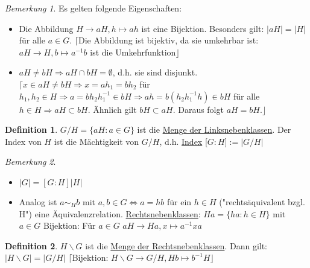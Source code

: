 \documentclass[12pt]{scrartcl}%
\theoremstyle{definition}
\newtheorem*{defn}{Definition}
\theoremstyle{remark}
\newtheorem*{nb}{Bemerkung}
\begin{document}
\begin{nb}
	Es gelten folgende Eigenschaften: 
	\begin{itemize}
		\item Die Abbildung $H \rightarrow aH, h \mapsto ah$ ist eine Bijektion. Besonders gilt: $\vert aH \vert = \vert H \vert$ für alle $a \in G$. \newline $\lceil$Die Abbildung ist bijektiv, da sie umkehrbar ist: $aH \rightarrow H, b \mapsto a^{-1}b$ ist die Umkehrfunktion$\rfloor$
		\item $aH \neq bH \Rightarrow aH \cap bH = \emptyset$, d.h. sie sind disjunkt. \newline $\lceil x \in aH \neq bH \Rightarrow x = ah_{1} = bh_{2}$ für $h_{1},h_{2} \in H \Rightarrow a=bh_{2}h_{1}^{-1} \in bH \Rightarrow ah= b(h_{2}h_{1}^{-1}h) \in bH$ für alle $h \in H \Rightarrow aH \subset bH$. Ähnlich gilt $bH \subset aH$. Daraus folgt $aH=bH.\rfloor$ %
	\end{itemize}
\end{nb}

\begin{defn}
	$G/H = \lbrace aH : a \in G \rbrace$ ist die \underline{Menge der Linksnebenklassen}. \newline Der Index von $H$ ist die Mächtigkeit von $G/H$, d.h. \underline{Index} [$G:H$]$:=\vert G/H \vert$
\end{defn}

\begin{nb}
	\begin{itemize}
	 	\item $\vert G \vert = [G:H]\vert H\vert$
	 	\item Analog ist $a \sim_{H} b$ mit $a,b \in G \Leftrightarrow a=hb$ für ein $h \in H$ ("rechtsäquivalent bzgl. H") eine Äquivalenzrelation.
		\underline{Rechtsnebenklassen}: $Ha=\lbrace ha : h \in H\rbrace$ mit $a \in G$ \newline Bijektion: Für $a \in G$ $aH \rightarrow Ha, x \mapsto a^{-1}xa$
	\end{itemize}
\end{nb}

\begin{defn}
	$H \backslash G$ ist die \underline{Menge der Rechtsnebenklassen}. Dann gilt: $\vert H \backslash G \vert = \vert G/H \vert$ \newline $\lceil$Bijektion: $H \backslash G \rightarrow G/H, Hb \mapsto b^{-1}H \rfloor$
\end{defn}
\end{document}
